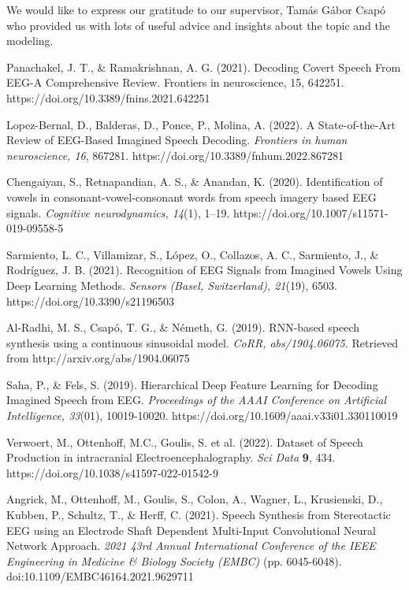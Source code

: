 \documentclass{article}
\begin{document}
We would like to express our gratitude to our supervisor, Tamás Gábor Csapó who provided us with lots of useful advice and insights about the topic and the modeling.


\begin{thebibliography}{9}

\small

 Panachakel, J. T., \& Ramakrishnan, A. G. (2021). Decoding Covert Speech From EEG-A Comprehensive Review. Frontiers in neuroscience, 15, 642251. https://doi.org/10.3389/fnins.2021.642251

 Lopez-Bernal, D., Balderas, D., Ponce, P., Molina, A. (2022). A State-of-the-Art Review of EEG-Based Imagined Speech Decoding. {\it Frontiers in human neuroscience, 16}, 867281. https://doi.org/10.3389/fnhum.2022.867281

 Chengaiyan, S.,  Retnapandian, A. S., \& Anandan, K. (2020). Identification of vowels in consonant-vowel-consonant words from speech imagery based EEG signals. {\it Cognitive neurodynamics, 14}(1), 1–19. https://doi.org/10.1007/s11571-019-09558-5

 Sarmiento, L. C., Villamizar, S., López, O.,  Collazos, A. C.,  Sarmiento, J., \&  Rodríguez, J. B. (2021). Recognition of EEG Signals from Imagined Vowels Using Deep Learning Methods. {\it Sensors (Basel, Switzerland), 21}(19), 6503. https://doi.org/10.3390/s21196503

 Al-Radhi, M. S., Csapó, T. G., \&  Németh, G. (2019). RNN-based speech synthesis using a continuous sinusoidal model. {\it CoRR, abs/1904.06075.} Retrieved from http://arxiv.org/abs/1904.06075

 Saha, P., \& Fels, S. (2019). Hierarchical Deep Feature Learning for Decoding Imagined Speech from EEG. {\it Proceedings of the AAAI Conference on Artificial Intelligence, 33}(01), 10019-10020. https://doi.org/10.1609/aaai.v33i01.330110019

 Verwoert, M., Ottenhoff, M.C., Goulis, S. et al. (2022). Dataset of Speech Production in intracranial Electroencephalography. {\it Sci Data} {\bf 9}, 434. https://doi.org/10.1038/s41597-022-01542-9

 Angrick, M., Ottenhoff, M., Goulis, S., Colon, A., Wagner, L., Krusienski, D., Kubben, P., Schultz, T., \& Herff, C. (2021). Speech Synthesis from Stereotactic EEG using an Electrode Shaft Dependent Multi-Input Convolutional Neural Network Approach. {\it 2021 43rd Annual International Conference of the IEEE Engineering in Medicine \& Biology Society (EMBC)} (pp. 6045-6048). doi:10.1109/EMBC46164.2021.9629711


\end{thebibliography}
\end{document}
